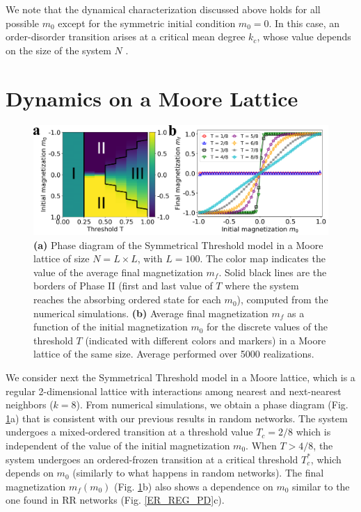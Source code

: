 We note that the dynamical characterization discussed above holds for all possible $m_0$ except for the symmetric initial condition $m_0 = 0$. In this case, an order-disorder transition arises at a critical mean degree $k_c$, whose value depends on the size of the system $N$ \cite{Konstantin}.

\section{\label{sec: Dynamics on a Moore Lattice}  Dynamics on a Moore Lattice}

\begin{figure}
		\centering \captionsetup{font=sf}
		\includegraphics[width=\textwidth]{Figs/Aging_STM/FIG9.pdf}
		\caption[Symmetrical Threshold model in a Moore lattice]{\label{LAT_PD} \textbf{(a)} Phase diagram of the Symmetrical Threshold model in a Moore lattice of size $N = L \times L$, with $L = 100$. The color map indicates the value of the average final magnetization $m_f$. Solid black lines are the borders of Phase II (first and last value of $T$ where the system reaches the absorbing ordered state for each $m_0$), computed from the numerical simulations. \textbf{(b)} Average final magnetization $m_f$ as a function of the initial magnetization $m_0$ for the discrete values of the threshold $T$ (indicated with different colors and markers) in a Moore lattice of the same size. Average performed over 5000 realizations.}
\end{figure}

We consider next the Symmetrical Threshold model in a Moore lattice, which is a regular 2-dimensional lattice with interactions among nearest and next-nearest neighbors ($k=8$).  From numerical simulations, we obtain a phase diagram (Fig. \ref{LAT_PD}a) that is consistent with our previous results in random networks. The system undergoes a mixed-ordered transition at a threshold value $T_{c} = 2/8$  which is independent of the value of the initial magnetization $m_0$. When $T > 4/8$, the system undergoes an ordered-frozen transition at a critical threshold $T_{c}^{*}$, which depends on $m_0$ (similarly to what happens in random networks). The final magnetization $m_f(m_0)$ (Fig. \ref{LAT_PD}b) also shows a dependence on $m_0$ similar to the one found in RR networks (Fig. \ref{ER_REG_PD}c).

